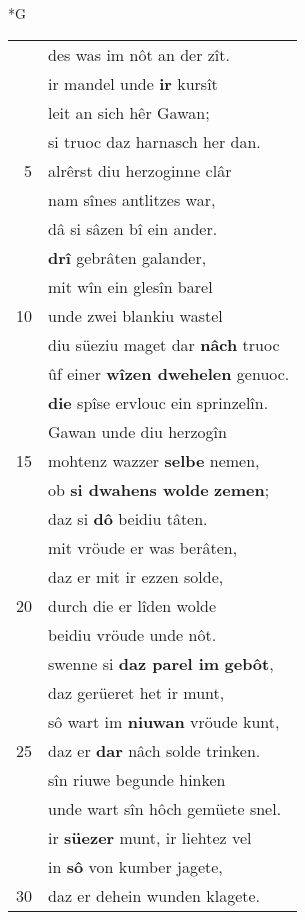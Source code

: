 \documentclass[8pt,a4paper,notitlepage]{article}
\begin{document}
\begin{table}[ht]
\begin{minipage}[t]{0.5\linewidth}
\small
\begin{center}*G
\end{center}
\begin{tabular}{rl}
 & des was im nôt an der zît.\\ 
 & ir mandel unde \textbf{ir} kursît\\ 
 & leit an sich hêr Gawan;\\ 
 & si truoc daz harnasch her dan.\\ 
5 & alrêrst diu herzoginne clâr\\ 
 & nam sînes antlitzes war,\\ 
 & dâ si sâzen bî ein ander.\\ 
 & \textbf{drî} gebrâten galander,\\ 
 & mit wîn ein glesîn barel\\ 
10 & unde zwei blankiu wastel\\ 
 & diu süeziu maget dar \textbf{nâch} truoc\\ 
 & ûf einer \textbf{wîzen dwehelen} genuoc.\\ 
 & \textbf{die} spîse ervlouc ein sprinzelîn.\\ 
 & Gawan unde diu herzogîn\\ 
15 & mohtenz wazzer \textbf{selbe} nemen,\\ 
 & ob \textbf{si dwahens wolde} \textbf{zemen};\\ 
 & daz si \textbf{dô} beidiu tâten.\\ 
 & mit vröude er was berâten,\\ 
 & daz er mit ir ezzen solde,\\ 
20 & durch die er lîden wolde\\ 
 & beidiu vröude unde nôt.\\ 
 & swenne si \textbf{daz parel im} \textbf{gebôt},\\ 
 & daz gerüeret het ir munt,\\ 
 & sô wart im \textbf{niuwan} vröude kunt,\\ 
25 & daz er \textbf{dar} nâch solde trinken.\\ 
 & sîn riuwe begunde hinken\\ 
 & unde wart sîn hôch gemüete snel.\\ 
 & ir \textbf{süezer} munt, ir liehtez vel\\ 
 & in \textbf{sô} von kumber jagete,\\ 
30 & daz er dehein wunden klagete.\\ 

\end{tabular}
\end{minipage}
\end{table}
\end{document}
